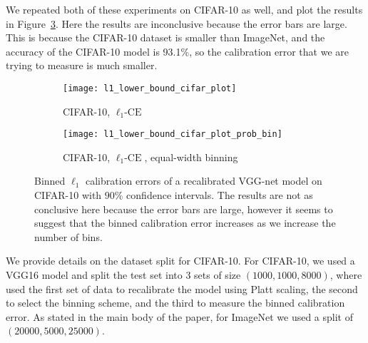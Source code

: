 We repeated both of these experiments on CIFAR-10 as well, and plot the results in Figure~\ref{fig:lower_bounds_l1_cifar}. Here the results are inconclusive because the error bars are large. This is because the CIFAR-10 dataset is smaller than ImageNet, and the accuracy of the CIFAR-10 model is 93.1\%, so the calibration error that we are trying to measure is much smaller.

\begin{figure}
     \centering
     \begin{subfigure}[b]{0.45\textwidth}
         \centering
         \texttt{[image: l1\_lower\_bound\_cifar\_plot]}
         \caption{CIFAR-10, $\ell_1\mbox{-CE}$}
         \label{fig:cifar_lower_bound_l1}
     \end{subfigure}
     \hfill
     \begin{subfigure}[b]{0.45\textwidth}
         \centering
         \texttt{[image: l1\_lower\_bound\_cifar\_plot\_prob\_bin]}
         \caption{CIFAR-10, $\ell_1\mbox{-CE}$, equal-width binning}
         \label{fig:cifar_lower_bound_l1_prob}
     \end{subfigure}
        \caption{
        Binned $\ell_1$ calibration errors of a recalibrated VGG-net model on CIFAR-10 with $90\%$ confidence intervals. The results are not as conclusive here because the error bars are large, however it seems to suggest that the binned calibration error increases as we increase the number of bins.
        }
        \label{fig:lower_bounds_l1_cifar}
\end{figure}

We provide details on the dataset split for CIFAR-10. For CIFAR-10, we used a VGG16 model and split the test set into 3 sets of size $(1000, 1000, 8000)$, where used the first set of data to recalibrate the model using Platt scaling, the second to select the binning scheme, and the third to measure the binned calibration error. As stated in the main body of the paper, for ImageNet we used a split of $(20000, 5000, 25000)$.
